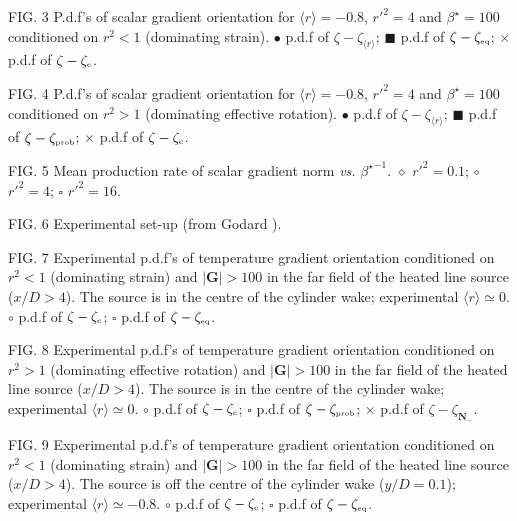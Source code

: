 \documentclass[doublespacing]{elsart}
\begin{document}
\bigskip

\noindent
FIG. 3
P.d.f's of scalar gradient orientation for
$ \langle r \rangle = -0.8 $, $ r'^2 = 4 $
and $ \beta^{\star} = 100 $
conditioned on $ r^2 < 1 $ (dominating strain).
$ \bullet $ p.d.f of $ \zeta - \zeta_{\langle r \rangle} $;
$ \blacksquare $ p.d.f of $ \zeta - \zeta_{\mbox{\tiny eq}} $;
$ \times $ p.d.f of $ \zeta - \zeta_{\mbox{\tiny c}} $.

\bigskip

\noindent
FIG. 4
P.d.f's of scalar gradient orientation for
$ \langle r \rangle = -0.8 $, $ r'^2 = 4 $
and $ \beta^{\star} = 100 $
conditioned on $ r^2 > 1 $ (dominating effective rotation).
$ \bullet $ p.d.f of $ \zeta - \zeta_{\langle r \rangle} $;
$ \blacksquare $ p.d.f of $ \zeta - \zeta_{\mbox{\tiny prob}} $;
$ \times $ p.d.f of $ \zeta - \zeta_{\mbox{\tiny c}} $.

\bigskip

\noindent
FIG. 5
Mean production rate of scalar gradient norm
{\em vs.} $ {\beta^{\star}}^{-1} $.
$ \diamond $ $ r'^2 = 0.1 $;
$ \circ $ $ r'^2 = 4 $;
$ \square $ $ r'^2 = 16 $.

\bigskip

\noindent
FIG. 6
Experimental set-up (from Godard \cite{G01}).

\bigskip

\noindent
FIG. 7
Experimental
p.d.f's of temperature gradient orientation
conditioned on $ r^2 < 1 $ (dominating strain)
and $ |\bm{G}| > 100 $ in the far field of
the heated line source ($ x/D > 4 $).
The
source is in the centre of the cylinder wake;
experimental $ \langle r \rangle \simeq 0 $.
$ \circ $ p.d.f of $ \zeta - \zeta_{\mbox{\tiny c}} $;
$ \square $ p.d.f of $ \zeta - \zeta_{\mbox{\tiny eq}} $.

\bigskip

\noindent
FIG. 8
Experimental
p.d.f's of temperature gradient orientation
conditioned on $ r^2 > 1 $ (dominating effective rotation)
and $ |\bm{G}| > 100 $ in the far field of
the heated line source ($ x/D > 4 $).
The
source is in the centre of the cylinder wake;
experimental $ \langle r \rangle \simeq 0 $.
$ \circ $ p.d.f of $ \zeta - \zeta_{\mbox{\tiny c}} $;
$ \square $ p.d.f of $ \zeta - \zeta_{\mbox{\tiny prob}} $;
$ \times $ p.d.f of $ \zeta - \zeta_{\bm{N}_-} $. 

\bigskip

\noindent
FIG. 9
Experimental
p.d.f's of temperature gradient orientation
conditioned on $ r^2 < 1 $ (dominating strain)
and $ |\bm{G}| > 100 $ in the far field of
the heated line source ($ x/D > 4 $).
The
source is off the centre of the cylinder wake
($ y/D = 0.1 $);
experimental $ \langle r \rangle \simeq -0.8 $.
$ \circ $ p.d.f of $ \zeta - \zeta_{\mbox{\tiny c}} $;
$ \square $ p.d.f of $ \zeta - \zeta_{\mbox{\tiny eq}} $.
\end{document}
